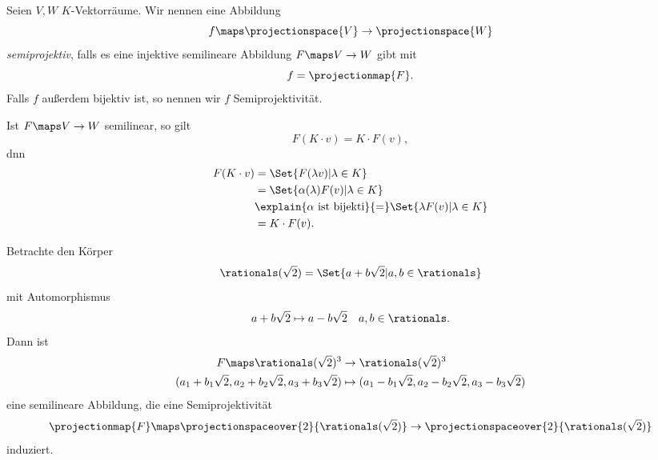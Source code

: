 \begin{definition*}
  Seien \( V,W \) \( K \)-Vektorräume. Wir nennen eine Abbildung
  \begin{equation*}
    f\maps \projectionspace{V}\to \projectionspace{W}
  \end{equation*}
  \emph{semiprojektiv}, falls es eine injektive semilineare Abbildung \( F\maps V\to W \) gibt mit
  \begin{equation*}
    f=\projectionmap{F}.
  \end{equation*}
  Falls \( f \) außerdem bijektiv ist, so nennen wir \( f \) Semiprojektivität.
\end{definition*}
\begin{bemerkung*}
  Ist \( F\maps V\to W \) semilinear, so gilt
  \begin{equation*}
    F(K\cdot v)=K\cdot F(v),
  \end{equation*}
  dnn
  \begin{align*}
    F(K\cdot v)&=\Set{F(\lambda v)|\lambda\in K}\\
    &=\Set{\alpha(\lambda)F(v)|\lambda\in K}\\
    &\explain{\alpha \text{ ist bijekti}}{=}\Set{\lambda F(v)|\lambda\in K}\\
    &=K\cdot F(v).
  \end{align*}
\end{bemerkung*}
\begin{beispiel*}
  Betrachte den Körper
  \begin{equation*}
    \rationals(\sqrt{2})=\Set{a+b\sqrt{2}|a,b\in \rationals}
  \end{equation*}
  mit Automorphismus
  \begin{equation*}
    a+b\sqrt{2}\mapsto a-b\sqrt{2}\quad a,b\in \rationals.
  \end{equation*}
  Dann ist
  \begin{equation}
    \begin{split}
      F\maps \rationals(\sqrt{2})^3&\to \rationals(\sqrt{2})^3\\
      (a_1+b_1\sqrt{2},a_2+b_2\sqrt{2},a_3+b_3\sqrt{2})&\mapsto (a_1-b_1\sqrt{2}, a_2-b_2\sqrt{2},a_3-b_3\sqrt{2})
    \end{split}
  \end{equation}
  eine semilineare Abbildung, die eine Semiprojektivität
  \begin{equation*}
    \projectionmap{F}\maps \projectionspaceover{2}{\rationals(\sqrt{2})}\to\projectionspaceover{2}{\rationals(\sqrt{2})}
  \end{equation*}
  induziert.
\end{beispiel*}
